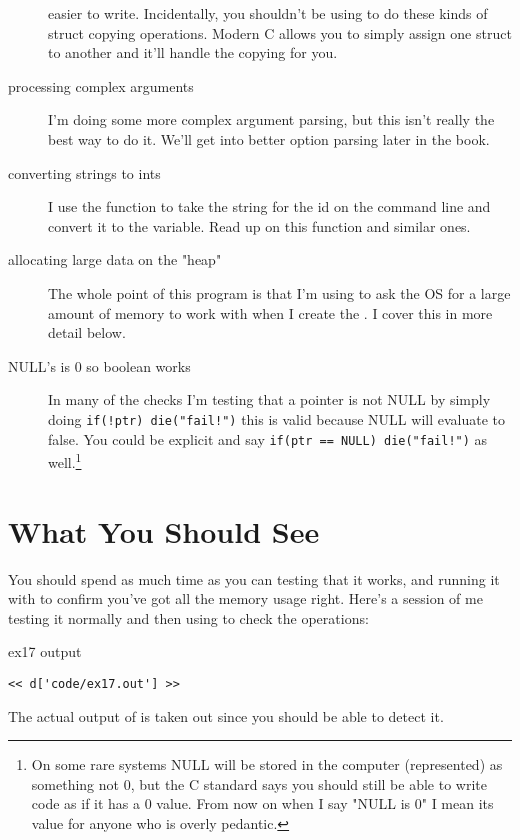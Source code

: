 \begin{description}
    easier to write.  Incidentally, you shouldn't be using  to do
    these kinds of struct copying operations. Modern C allows you to simply assign
    one struct to another and it'll handle the copying for you.
\item [processing complex arguments] I'm doing some more complex argument parsing,
    but this isn't really the best way to do it.  We'll get into better option
    parsing later in the book.
\item [converting strings to ints] I use the  function to take the
    string for the id on the command line and convert it to the 
    variable.  Read up on this function and similar ones.
\item [allocating large data on the "heap"] The whole point of this program is
    that I'm using  to ask the OS for a large amount of memory
    to work with when I create the .  I cover this in more
    detail below.
\item [NULL's is 0 so boolean works] In many of the checks I'm testing that a
    pointer is not NULL by simply doing \verb|if(!ptr) die("fail!")| this is
    valid because NULL will evaluate to false.  You could
    be explicit and say \verb|if(ptr == NULL) die("fail!")| as well.\footnote{On some rare systems NULL will
        be stored in the computer (represented) as something not 0, but the C standard says you should still be able to write
            code as if it has a 0 value. From now on when I say "NULL is 0" I mean its value for anyone
            who is overly pedantic.}
\end{description}


\section{What You Should See}

You should spend as much time as you can testing that it works, and running
it with  to confirm you've got all the memory usage
right.  Here's a session of me testing it normally and then using
 to check the operations:

\begin{code}{ex17 output}
\begin{lstlisting}
<< d['code/ex17.out'] >>
\end{lstlisting}
\end{code}

The actual output of  is taken out since you should
be able to detect it.

